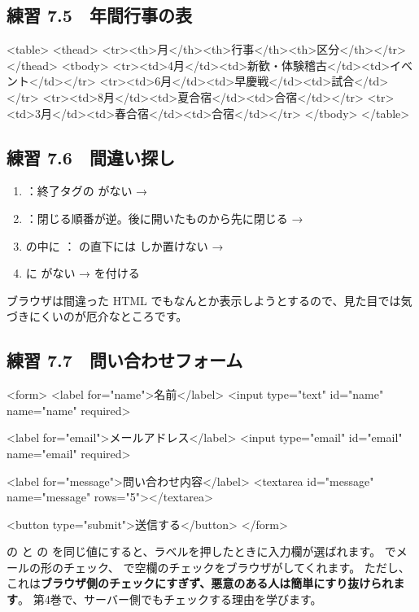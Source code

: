 \subsection*{練習 7.5　年間行事の表}
\begin{Piton}[language=code]
<table>
  <thead>
    <tr><th>月</th><th>行事</th><th>区分</th></tr>
  </thead>
  <tbody>
    <tr><td>4月</td><td>新歓・体験稽古</td><td>イベント</td></tr>
    <tr><td>6月</td><td>早慶戦</td><td>試合</td></tr>
    <tr><td>8月</td><td>夏合宿</td><td>合宿</td></tr>
    <tr><td>3月</td><td>春合宿</td><td>合宿</td></tr>
  </tbody>
</table>
\end{Piton}

\subsection*{練習 7.6　間違い探し}
\begin{enumerate}
  \item {}：終了タグの \code{/} がない → 
  \item {}：閉じる順番が逆。後に開いたものから先に閉じる → 
  \item {} の中に ： の直下には  しか置けない → 
  \item {} に  がない →  を付ける
\end{enumerate}
ブラウザは間違った HTML でもなんとか表示しようとするので、見た目では気づきにくいのが厄介なところです。

\subsection*{練習 7.7　問い合わせフォーム}
\begin{Piton}[language=code]
<form>
  <label for="name">名前</label>
  <input type="text" id="name" name="name" required>

  <label for="email">メールアドレス</label>
  <input type="email" id="email" name="email" required>

  <label for="message">問い合わせ内容</label>
  <textarea id="message" name="message" rows="5"></textarea>

  <button type="submit">送信する</button>
</form>
\end{Piton}
 の  と  の  を同じ値にすると、ラベルを押したときに入力欄が選ばれます。
 でメールの形のチェック、 で空欄のチェックをブラウザがしてくれます。
ただし、これは\textbf{ブラウザ側のチェックにすぎず、悪意のある人は簡単にすり抜けられます}。
第4巻で、サーバー側でもチェックする理由を学びます。

